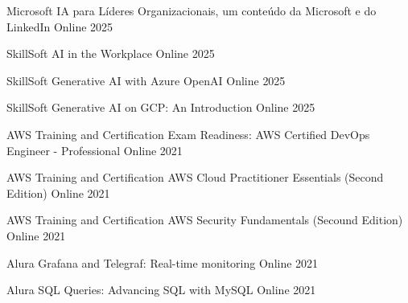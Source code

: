 
\begin{cvhonors}

  \cvhonor
    {Microsoft} %
    {IA para Líderes Organizacionais, um conteúdo da Microsoft e do LinkedIn} %
    {Online} %
    {2025} %

  \cvhonor
    {SkillSoft} %
    {AI in the Workplace} %
    {Online} %
    {2025} %

  \cvhonor
    {SkillSoft} %
    {Generative AI with Azure OpenAI} %
    {Online} %
    {2025} %

  \cvhonor
    {SkillSoft} %
    {Generative AI on GCP: An Introduction} %
    {Online} %
    {2025} %

  \cvhonor
    {AWS Training and Certification} %
    {Exam Readiness: AWS Certified DevOps Engineer - Professional} %
    {Online} %
    {2021} %

  \cvhonor
    {AWS Training and Certification} %
    {AWS Cloud Practitioner Essentials (Second Edition)} %
    {Online} %
    {2021} %

  \cvhonor
    {AWS Training and Certification} %
    {AWS Security Fundamentals (Secound Edition)} %
    {Online} %
    {2021} %

  \cvhonor
    {Alura} %
    {Grafana and Telegraf: Real-time monitoring} %
    {Online} %
    {2021} %

  \cvhonor
    {Alura} %
    {SQL Queries: Advancing SQL with MySQL} %
    {Online} %
    {2021} %


\end{cvhonors}
